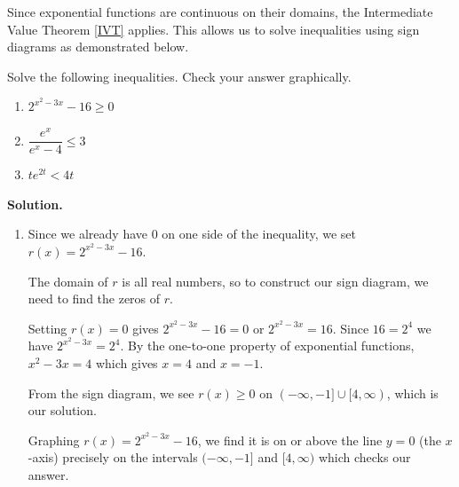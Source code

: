 \documentclass{ximera}
\begin{document}
Since exponential functions are continuous on their domains, the Intermediate Value Theorem \ref{IVT} applies. This allows us to solve inequalities using sign diagrams as demonstrated below.

\begin{ex}  Solve the following inequalities.  Check your answer graphically.
\label{expineq}

\begin{multicols}{3}

\begin{enumerate}

\item \label{canuselogsex} $2^{x^2-3x} - 16 \geq 0$

\item  $\dfrac{e^{x}}{e^{x}-4} \leq 3$

\item  $t e^{2t} < 4t$

\end{enumerate}

\end{multicols}

\newpage

{\bf Solution.}

\begin{enumerate}

\item  Since we already have $0$ on one side of the inequality, we set $r(x) = 2^{x^2-3x} - 16$.  

\smallskip

The domain of $r$ is all real numbers, so to construct our sign diagram, we need to find the zeros of $r$.  

\smallskip

Setting $r(x) = 0$ gives $2^{x^2-3x} - 16 = 0$ or $2^{x^2-3x} = 16$.  Since $16 = 2^{4}$ we have $2^{x^2-3x} = 2^{4}$.   By the one-to-one property of exponential functions, $x^2 -3x = 4$ which gives $x=4$ and $x=-1$.  

\smallskip

From the sign diagram, we see $r(x) \geq 0$ on $(-\infty, -1] \cup [4, \infty)$, which is our solution.  

\smallskip

Graphing $r(x) = 2^{x^2-3x} - 16$,  we find it is on or above the line $y=0$ (the $x$-axis) precisely on the intervals  $(-\infty, -1]$ and $ [4, \infty)$ which checks our answer.

\begin{center}


\end{center}
\end{enumerate}
\end{ex}
\end{document}
